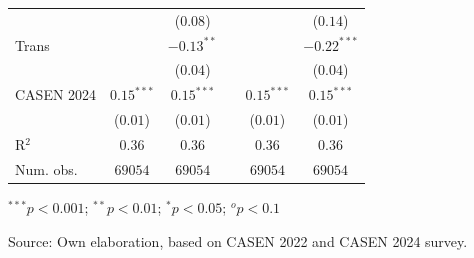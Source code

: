 \begin{table}[H]
\begin{center}
\begin{threeparttable}
\begin{tabular}{lccccc}
 & & ($0.08$) & & & ($0.14$) \\ 
Trans & & $-0.13^{**}$ & & & $-0.22^{***}$ \\ 
 & & ($0.04$) & & & ($0.04$) \\ 
CASEN 2024 & $0.15^{***}$& $0.15^{***}$ & & $0.15^{***}$& $0.15^{***}$ \\ 
 & ($0.01$)& ($0.01$) & & ($0.01$)& ($0.01$) \\ 
R$^2$ & $0.36$& $0.36$ & & $0.36$& $0.36$ \\ 
Num. obs. & $69054$& $69054$ & & $69054$& $69054$ \\ \bottomrule
\end{tabular}
\begin{tablenotes}
\item ${}^{***}p<0.001$; ${}^{**}p<0.01$; ${}^{*}p<0.05$; ${}^{o}p<0.1$
\item Source: Own elaboration, based on CASEN 2022 and CASEN 2024 survey.
\end{tablenotes}
\end{threeparttable}
\end{center}
\end{table}